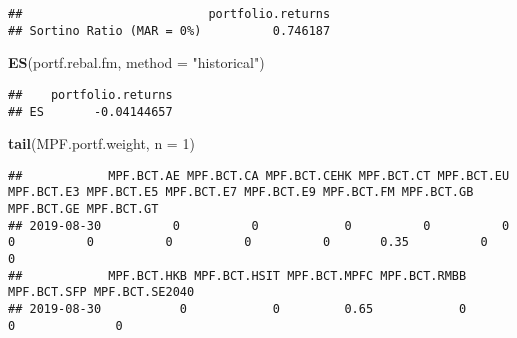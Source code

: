 \documentclass[
]{article}
\newenvironment{Shaded}{\begin{snugshade}}{\end{snugshade}}
\newcommand{\DataTypeTok}[1]{\textcolor[rgb]{0.13,0.29,0.53}{#1}}
\newcommand{\DecValTok}[1]{\textcolor[rgb]{0.00,0.00,0.81}{#1}}
\newcommand{\KeywordTok}[1]{\textcolor[rgb]{0.13,0.29,0.53}{\textbf{#1}}}
\newcommand{\NormalTok}[1]{#1}
\newcommand{\StringTok}[1]{\textcolor[rgb]{0.31,0.60,0.02}{#1}}
\begin{document}
\begin{verbatim}
##                          portfolio.returns
## Sortino Ratio (MAR = 0%)          0.746187
\end{verbatim}

\begin{Shaded}
\begin{Highlighting}[]
\KeywordTok{ES}\NormalTok{(portf.rebal.fm, }\DataTypeTok{method =} \StringTok{"historical"}\NormalTok{)}
\end{Highlighting}
\end{Shaded}

\begin{verbatim}
##    portfolio.returns
## ES       -0.04144657
\end{verbatim}

\begin{Shaded}
\begin{Highlighting}[]
\KeywordTok{tail}\NormalTok{(MPF.portf.weight, }\DataTypeTok{n =} \DecValTok{1}\NormalTok{)}
\end{Highlighting}
\end{Shaded}

\begin{verbatim}
##            MPF.BCT.AE MPF.BCT.CA MPF.BCT.CEHK MPF.BCT.CT MPF.BCT.EU MPF.BCT.E3 MPF.BCT.E5 MPF.BCT.E7 MPF.BCT.E9 MPF.BCT.FM MPF.BCT.GB MPF.BCT.GE MPF.BCT.GT
## 2019-08-30          0          0            0          0          0          0          0          0          0          0       0.35          0          0
##            MPF.BCT.HKB MPF.BCT.HSIT MPF.BCT.MPFC MPF.BCT.RMBB MPF.BCT.SFP MPF.BCT.SE2040
## 2019-08-30           0            0         0.65            0           0              0
\end{verbatim}
\end{document}
